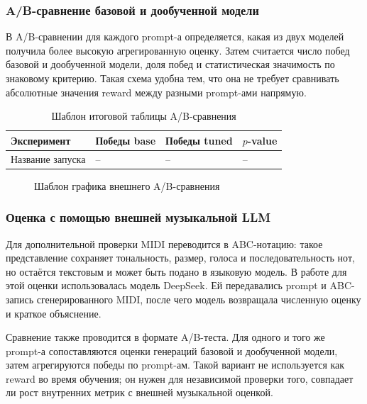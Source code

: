 \documentclass[a4paper,12pt]{extarticle}
\begin{document}
\subsubsection{A/B-сравнение базовой и дообученной модели}

В A/B-сравнении для каждого prompt-а определяется, какая из двух моделей
получила более высокую агрегированную оценку. Затем считается число побед
базовой и дообученной модели, доля побед и статистическая значимость по
знаковому критерию. Такая схема удобна тем, что она не требует сравнивать
абсолютные значения reward между разными prompt-ами напрямую.

\begin{table}[h]
\centering
\caption{Шаблон итоговой таблицы A/B-сравнения}
\label{tab:ab-summary-placeholder}
\begin{tabular}{|p{}|p{}|p{}|p{}|}
\hline
\textbf{Эксперимент} & \textbf{Победы base} & \textbf{Победы tuned} & \textbf{$p$-value} \\
\hline
Название запуска & -- & -- & -- \\
\hline
\end{tabular}
\end{table}

\begin{figure}[h]
\centering
{}
\caption{Шаблон графика внешнего A/B-сравнения}
\label{fig:ab-comparison-placeholder}
\end{figure}

\subsubsection{Оценка с помощью внешней музыкальной LLM}

Для дополнительной проверки MIDI переводится в ABC-нотацию: такое
представление сохраняет тональность, размер, голоса и последовательность нот,
но остаётся текстовым и может быть подано в языковую модель. В работе для этой
оценки использовалась модель DeepSeek. Ей передавались prompt и ABC-запись
сгенерированного MIDI, после чего модель возвращала численную оценку и краткое
объяснение.

Сравнение также проводится в формате A/B-теста. Для одного и того же prompt-а
сопоставляются оценки генераций базовой и дообученной модели, затем
агрегируются победы по prompt-ам. Такой вариант не используется как reward во
время обучения; он нужен для независимой проверки того, совпадает ли рост
внутренних метрик с внешней музыкальной оценкой.
\end{document}
